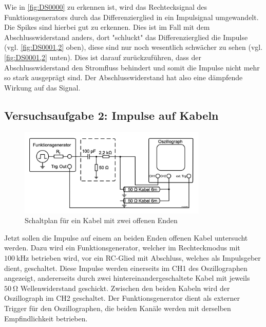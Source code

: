\documentclass{article}
\begin{document}
				Wie in \ref{fig:DS0000} zu erkennen ist, wird das Rechtecksignal des Funktionsgenerators durch das Differenzierglied in ein Impulsignal umgewandelt. Die Spikes sind hierbei gut zu erkennen. Dies ist im Fall mit dem Abschlusswiderstand anders, dort "schluckt" das Differenzierglied die Impulse (vgl. \ref{fig:DS0001,2} oben), diese sind nur noch wesentlich schwächer zu sehen (vgl. \ref{fig:DS0001,2} unten). Dies ist darauf zurückzuführen, dass der Abschlusswiderstand den Stromfluss behindert und somit die Impulse nicht mehr so stark ausgeprägt sind. Der Abschlusswiderstand hat also eine dämpfende Wirkung auf das Signal.

	
\clearpage

\subsection{Versuchsaufgabe 2: Impulse auf Kabeln} 

			
			\begin{figure}[H]
				\centering
				\includegraphics[width=0.8\textwidth]{figs/Aufbau_1_2_Impulse_auf_Kabeln.png}
				\caption{Schaltplan für ein Kabel mit zwei offenen Enden~\cite{anleitung}}
				\label{fig:aufbau_1_1_impulseAufKabeln}
			\end{figure}
			Jetzt sollen die Impulse auf einem an beiden Enden offenen Kabel untersucht werden. Dazu wird ein Funktionsgenerator, welcher im Rechteckmodus mit $\SI{100}{\kilo\hertz}$ betrieben wird, vor ein RC-Glied mit Abschluss, welches als Impulsgeber dient, geschaltet. Diese Impulse werden einerseits im CH1 des Oszillographen angezeigt, andererseits durch zwei hintereinandergeschaltete Kabel mit jeweils $\SI{50}{\ohm}$ Wellenwiderstand geschickt. Zwischen den beiden Kabeln wird der Oszillograph im CH2 geschaltet. Der Funktionsgenerator dient als externer Trigger für den Oszillographen, die beiden Kanäle werden mit derselben Empfindlichkeit betrieben.
			
\end{document}
